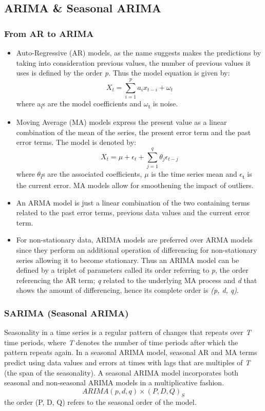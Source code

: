 \documentclass[a4paper,12pt]{article}
\begin{document}
\subsection{ARIMA \& Seasonal ARIMA}
\label{sec:org69d46a8}
\subsubsection{From AR to ARIMA}
\label{sec:org7447969}
\begin{itemize}
\item Auto-Regressive (AR) models, as the name suggests makes the predictions by taking into consideration previous values, the number of previous values it uses is defined by the order \emph{p}. Thus the model equation is given by:
\[
    X_{t} = \sum_{i=1}^{p} a_{i}x_{t-i} + \omega_{t}
  \]
where a\textsubscript{i}s are the model coefficients and \(\omega\)\textsubscript{t} is noise.
\item Moving Average (MA) models express the present value as a linear combination of the mean of the series, the present error term and the past error terms. The model is denoted by:
\[
    X_{t} = \mu + \epsilon_{t} + \sum_{j=1}^{q} \theta_{j} \epsilon_{t-j}
  \]
where \(\theta\)\textsubscript{i}s are the associated coefficients, \(\mu\) is the time series mean and \(\epsilon\)\textsubscript{t} is the current error. MA models allow for smoothening the impact of outliers.
\item An ARMA model is just a linear combination of the two containing terms related to the past error terms, previous data values and the current error term.
\item For non-stationary data, ARIMA models are preferred over ARMA models since they perform an additional operation of differencing for non-stationary series allowing it to become stationary. Thus an ARIMA model can be defined by a triplet of parameters called its order referring to \emph{p}, the order referencing the AR term; \emph{q} related to the underlying MA process and \emph{d} that shows the amount of differencing, hence its complete order is \emph{(p, d, q)}.
\end{itemize}
\subsubsection{SARIMA (Seasonal ARIMA)}
\label{sec:orgb4c6bfd}
Seasonality in a time series is a regular pattern of changes that repeats over \emph{T} time periods, where \emph{T} denotes the number of time periods after which the pattern repeats again. In a seasonal ARIMA model, seasonal AR and MA terms predict using data values and errors at times with lags that are multiples of \emph{T} (the span of the seasonality). A seasonal ARIMA model incorporates both seasonal and non-seasonal ARIMA models in a multiplicative fashion.
\[
  ARIMA(p, d, q) \times (P, D, Q)_{S}
\]
the order (P, D, Q) refers to the seasonal order of the model.
\end{document}
